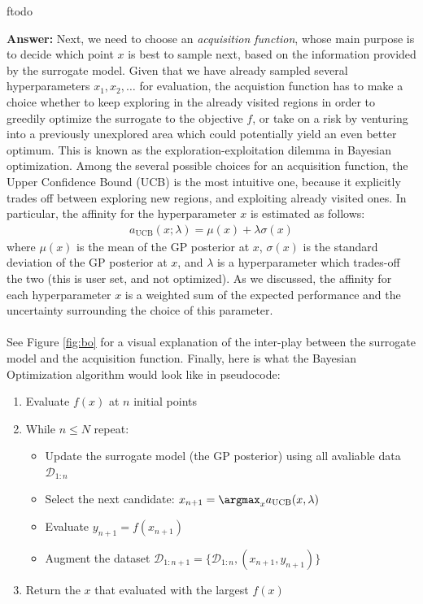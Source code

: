 ƒtodo\documentclass{article}
\newenvironment{QandA}{\begin{enumerate}[label=\arabic*.]}{\end{enumerate}}
\newenvironment{InnerQandA}{\begin{enumerate}[label=\roman*.]}{\end{enumerate}}
\newenvironment{answer}{\par\normalfont \textbf{Answer:}}{}
\begin{document}
\begin{QandA}
\begin{InnerQandA}
\begin{answer}
            Next, we need to choose an \textit{acquisition function}, whose main purpose is to decide which point $x$ is best to sample next, based on the information provided by the surrogate model. Given that we have already sampled several hyperparameters $x_1, x_2, \ldots$ for evaluation, the acquistion function has to make a choice whether to keep exploring in the already visited regions in order to greedily optimize the surrogate to the objective $f$, or take on a risk by venturing into a previously unexplored area which could potentially yield an even better optimum. This is known as the exploration-exploitation dilemma in Bayesian optimization. Among the several possible choices for an acquisition function, the Upper Confidence Bound (UCB) is the most intuitive one, because it explicitly trades off between exploring new regions, and exploiting already visited ones. In particular, the affinity for the hyperparameter $x$ is estimated as follows:
            \begin{align*}
                a_{\text{UCB}}(x; \lambda) = \mu(x) + \lambda \sigma(x)
            \end{align*}
            where $\mu(x)$ is the mean of the GP posterior at $x$, $\sigma(x)$ is the standard deviation of the GP posterior at $x$, and $\lambda$ is a hyperparameter which trades-off the two (this is user set, and not optimized). As we discussed, the affinity for each hyperparameter $x$ is a weighted sum of the expected performance and the uncertainty surrounding the choice of this parameter. \\\\
            See Figure \ref{fig:bo} for a visual explanation of the inter-play between the surrogate model and the acquisition function. Finally, here is what the Bayesian Optimization algorithm would look like in pseudocode:
            \begin{enumerate}[label={\arabic*.}]
                \item Evaluate $f(x)$ at $n$ initial points 
                \item While $n \le N$ repeat:
                \begin{itemize}
                    \item Update the surrogate model (the GP posterior) using all avaliable data $\mathcal{D}_{1:n}$ 
                    \item Select the next candidate: $x_{n+1} = \argmax_{x}a_{\text{UCB}}(x, \lambda)$
                    \item Evaluate $y_{n+1} = f(x_{n+1})$ 
                    \item Augment the dataset $\mathcal{D}_{1:n+1} = \{ \mathcal{D}_{1:n}, (x_{n+1}, y_{n+1}) \}$
                \end{itemize}
            \item Return the $x$ that evaluated with the largest $f(x)$
        \end{enumerate}


\end{answer}
\end{InnerQandA}
\end{QandA}
\end{document}
